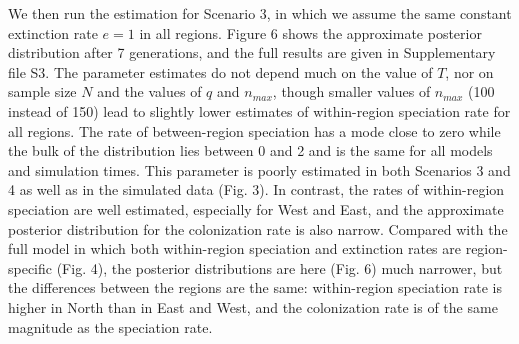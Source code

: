 We then run the estimation for Scenario 3, in which we assume the same constant extinction rate $e=1$ in all regions. 
Figure 6 shows the approximate posterior distribution after 7 generations, and the full results are given in Supplementary file S3. 
The parameter estimates do not depend much on the value of $T$, nor on sample size $N$ and the values of $q$ and $n_{max}$, though smaller values of  $n_{max}$  (100 instead of 150) lead to slightly lower estimates of within-region speciation rate for all regions. 
The rate of between-region speciation has a mode close to zero while the bulk of the distribution lies between 0 and 2 and is the same for all models and simulation times. 
This parameter is poorly estimated in both Scenarios 3 and 4 as well as in the simulated data (Fig. 3). 
In contrast, the rates of within-region speciation are well estimated, especially for West and East, and the approximate posterior distribution for the colonization rate is also narrow. Compared with the full model in which both within-region speciation and extinction rates are region-specific (Fig. 4), the posterior distributions are here (Fig. 6) much narrower, but the differences between the regions are the same: within-region speciation rate is higher in North than in East and West, and the colonization rate is of the same magnitude as the speciation rate.

